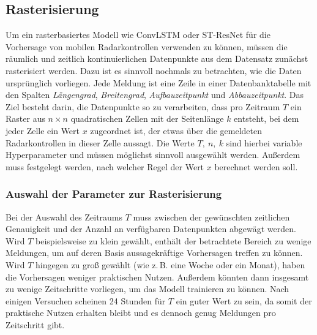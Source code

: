 \subsection{Rasterisierung}
\label{sec:Rasterisierung}
Um ein rasterbasiertes Modell wie ConvLSTM oder ST-ResNet für die Vorhersage von mobilen Radarkontrollen verwenden zu können, müssen die räumlich und zeitlich kontinuierlichen Datenpunkte aus dem Datensatz zunächst rasterisiert werden.
Dazu ist es sinnvoll nochmals zu betrachten, wie die Daten ursprünglich vorliegen.
Jede Meldung ist eine Zeile in einer Datenbanktabelle mit den Spalten \emph{Längengrad}, \emph{Breitengrad}, \emph{Aufbauzeitpunkt} und \emph{Abbauzeitpunkt}.
Das Ziel besteht darin, die Datenpunkte so zu verarbeiten, dass pro Zeitraum $T$ ein Raster aus $n \times n$ quadratischen Zellen mit der Seitenlänge $k$ entsteht, bei dem jeder Zelle ein Wert $x$ zugeordnet ist, der etwas über die gemeldeten Radarkontrollen in dieser Zelle aussagt.
Die Werte $T,~n,~k$ sind hierbei variable Hyperparameter und müssen möglichst sinnvoll ausgewählt werden.
Außerdem muss festgelegt werden, nach welcher Regel der Wert $x$ berechnet werden soll.

\subsubsection{Auswahl der Parameter zur Rasterisierung}
\label{sec:RasterisierungParameter}
Bei der Auswahl des Zeitraums $T$ muss zwischen der gewünschten zeitlichen Genauigkeit und der Anzahl an verfügbaren Datenpunkten abgewägt werden.
Wird $T$ beispielsweise zu klein gewählt, enthält der betrachtete Bereich zu wenige Meldungen, um auf deren Basis aussagekräftige Vorhersagen treffen zu können.
Wird $T$ hingegen zu groß gewählt (wie z.\,B. eine Woche oder ein Monat), haben die Vorhersagen weniger praktischen Nutzen.
Außerdem könnten dann insgesamt zu wenige Zeitschritte vorliegen, um das Modell trainieren zu können.
Nach einigen Versuchen scheinen 24 Stunden für $T$ ein guter Wert zu sein, da somit der praktische Nutzen erhalten bleibt und es dennoch genug Meldungen pro Zeitschritt gibt.

